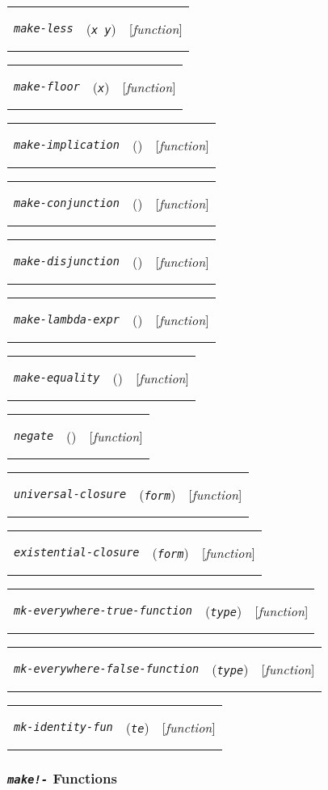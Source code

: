 \documentclass[12pt]{book}
\makeatletter
\newenvironment{function}[3]%
{\par\noindent\begin{boxedminipage}{\textwidth}%
 \par\noindent\begin{tabularx}{\linewidth}{l>{\raggedright}Xr}%
 \functionhtgt{#1}&(\texttt{\textit{#2}})&[\emph{#3}]%
 \end{tabularx}\par\flushright\begin{minipage}{.97\textwidth}}
{\end{minipage}\end{boxedminipage}}
\newcommand{\functionnm}[1]{\texttt{\textit{#1}}}
\newcommand{\functionhtgt}[1]{\hypertarget{#1}{\functionnm{#1}}\index{#1@\functionnm{#1}|underline}}
\newenvironment{lispfunction}[2]%
{\begin{function}{#1}{#2}{function}}{\end{function}}
\makeatother
\begin{document}
\begin{lispfunction}{make-less}{x y}
\end{lispfunction}

\begin{lispfunction}{make-floor}{x}
\end{lispfunction}

\begin{lispfunction}{make-implication}{}
\end{lispfunction}

\begin{lispfunction}{make-conjunction}{}
\end{lispfunction}

\begin{lispfunction}{make-disjunction}{}
\end{lispfunction}

\begin{lispfunction}{make-lambda-expr}{}
\end{lispfunction}

\begin{lispfunction}{make-equality}{}
\end{lispfunction}

\begin{lispfunction}{negate}{}
\end{lispfunction}

\begin{lispfunction}{universal-closure}{form}
\end{lispfunction}

\begin{lispfunction}{existential-closure}{form}
\end{lispfunction}

\begin{lispfunction}{mk-everywhere-true-function}{type}
\end{lispfunction}

\begin{lispfunction}{mk-everywhere-false-function}{type}
\end{lispfunction}

\begin{lispfunction}{mk-identity-fun}{te}
\end{lispfunction}

\subsubsection*{\functionnm{make!-} Functions}
\end{document}
